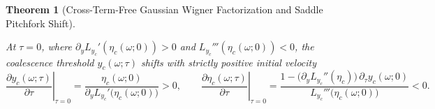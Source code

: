 \documentclass[11pt,reqno]{amsart}
\newtheorem{theorem}{Theorem}[section]
\theoremstyle{definition}
\theoremstyle{remark}
\numberwithin{equation}{section}
\begin{document}
\begin{theorem}[Cross-Term-Free Gaussian Wigner Factorization and Saddle Pitchfork Shift]
\begin{enumerate}[label=\textup{(\roman*)},leftmargin=2.2em]
\begin{equation}
\end{equation}
At $\tau = 0$, where $\partial_y L_{y_c}'(\eta_c(\omega;0)) > 0$ and $L_{y_c}'''(\eta_c(\omega;0)) < 0$, the coalescence threshold $y_c(\omega;\tau)$ shifts with strictly positive initial velocity
\begin{equation}\label{eq:pitchfork_velocity_tau0}
\left.\frac{\partial y_c(\omega;\tau)}{\partial\tau}\right|_{\tau=0} = \frac{\eta_c(\omega;0)}{\partial_y L_{y_c}'\bigl(\eta_c(\omega;0)\bigr)} > 0, \qquad \left.\frac{\partial \eta_c(\omega;\tau)}{\partial\tau}\right|_{\tau=0} = \frac{1 - \bigl(\partial_y L_{y_c}''(\eta_c)\bigr)\,\partial_\tau y_c(\omega;0)}{L_{y_c}'''\bigl(\eta_c(\omega;0)\bigr)} < 0.
\end{equation}
\end{enumerate}
\end{theorem}
\end{document}
